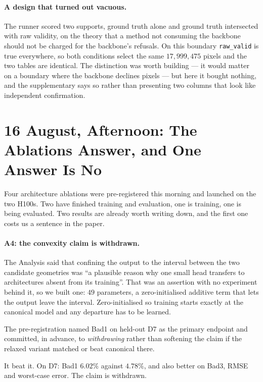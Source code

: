 \documentclass[11pt,a4paper]{article}
\begin{document}
\paragraph{A design that turned out vacuous.} The runner scored two
supports, ground truth alone and ground truth intersected with raw
validity, on the theory that a method not consuming the backbone should
not be charged for the backbone's refusals. On this boundary
\texttt{raw\_valid} is true everywhere, so both conditions select the same
$17{,}999{,}475$ pixels and the two tables are identical. The distinction
was worth building --- it would matter on a boundary where the backbone
declines pixels --- but here it bought nothing, and the supplementary says
so rather than presenting two columns that look like independent
confirmation.



\section*{16 August, Afternoon: The Ablations Answer, and One Answer Is No}

Four architecture ablations were pre-registered this morning and launched
on the two H100s. Two have finished training and evaluation, one is
training, one is being evaluated. Two results are already worth writing
down, and the first one costs us a sentence in the paper.

\paragraph{A4: the convexity claim is withdrawn.} The Analysis said that
confining the output to the interval between the two candidate geometries
was ``a plausible reason why one small head transfers to architectures
absent from its training''. That was an assertion with no experiment
behind it, so we built one: $49$ parameters, a zero-initialised additive
term that lets the output leave the interval. Zero-initialised so training
starts exactly at the canonical model and any departure has to be learned.

The pre-registration named Bad1 on held-out D7 as the primary endpoint and
committed, in advance, to \emph{withdrawing} rather than softening the
claim if the relaxed variant matched or beat canonical there.

It beat it. On D7: Bad1 $6.02\%$ against $4.78\%$, and also better on
Bad3, RMSE and worst-case error. The claim is withdrawn.
\end{document}
